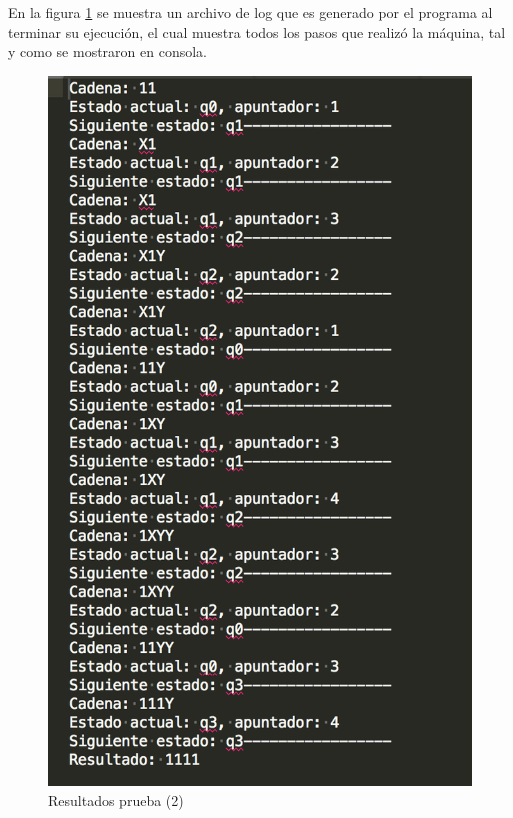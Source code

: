 	En la figura \ref{fig:maquin3} se muestra un archivo de log que es generado por el programa al terminar su ejecución, el cual muestra todos los pasos que realizó la máquina, tal y como se mostraron en consola.
	\begin{figure}[H]
		\begin{center}
			\includegraphics[scale=.8]{MT/img/prueba2.png}
			\caption{Resultados prueba (2)}
			\label{fig:maquin3}
		\end{center}
	\end{figure}
	
